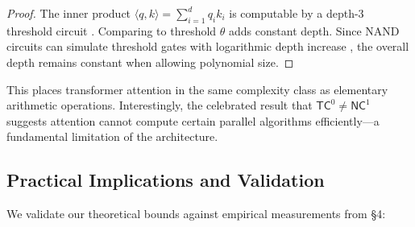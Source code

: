 \documentclass[11pt]{article}
\theoremstyle{definition}
\begin{document}
\begin{proof}






The inner product $\langle q, k \rangle = \sum_{i=1}^d q_i k_i$ is computable by a depth-3 threshold circuit \cite{yao1990computing}. Comparing to threshold $\theta$ adds constant depth. Since NAND circuits can simulate threshold gates with logarithmic depth increase \cite{chandra1984constant}, the overall depth remains constant when allowing polynomial size.






\end{proof}













This places transformer attention in the same complexity class as elementary arithmetic operations. Interestingly, the celebrated result that $\mathsf{TC}^0 \neq \mathsf{NC}^1$ \cite{razborov1987lower} suggests attention cannot compute certain parallel algorithms efficiently---a fundamental limitation of the architecture.













\subsection{Practical Implications and Validation}













We validate our theoretical bounds against empirical measurements from §4:
\end{document}
